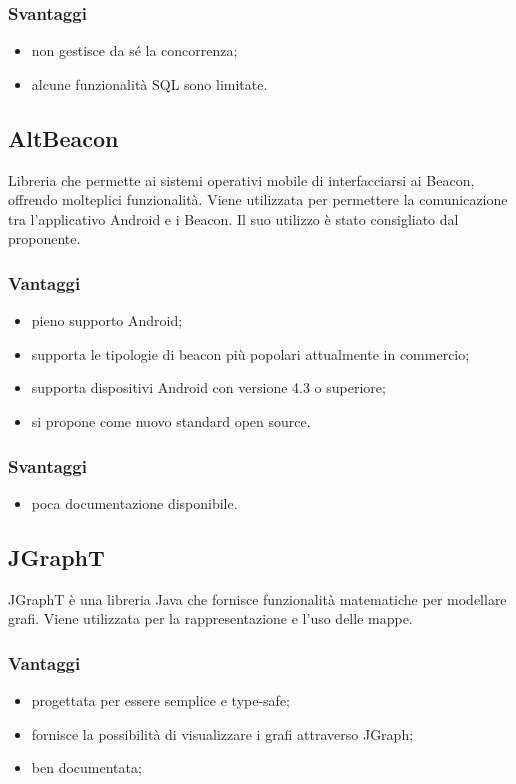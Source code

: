 \documentclass[../SpecificaTecnica.tex]{subfiles}
\begin{document}
		\subsubsection{Svantaggi}
		\begin{itemize}
			\item non gestisce da sé la concorrenza;
			\item alcune funzionalità SQL sono limitate.
		\end{itemize}
		
	\subsection{AltBeacon}
		Libreria che permette ai sistemi operativi mobile di interfacciarsi ai Beacon, offrendo molteplici funzionalità. Viene utilizzata per permettere la comunicazione tra l'applicativo Android e i Beacon. Il suo utilizzo è stato consigliato dal proponente.
		\subsubsection{Vantaggi}
			\begin{itemize}
				\item pieno supporto Android;
				\item supporta le tipologie di beacon più popolari attualmente in commercio;
				\item supporta dispositivi Android con versione 4.3 o superiore;
				\item si propone come nuovo standard open source.
			\end{itemize}
		\subsubsection{Svantaggi}
			\begin{itemize}
				\item poca documentazione disponibile.
			\end{itemize}
			
	\subsection{JGraphT}
		JGraphT è una libreria Java che fornisce funzionalità matematiche per modellare grafi. Viene utilizzata per la rappresentazione e l'uso delle mappe.
		\subsubsection{Vantaggi}
			\begin{itemize}
				\item progettata per essere semplice e type-safe;
				\item fornisce la possibilità di visualizzare i grafi attraverso JGraph;
				\item ben documentata;
			\end{itemize}
			
\end{document}
